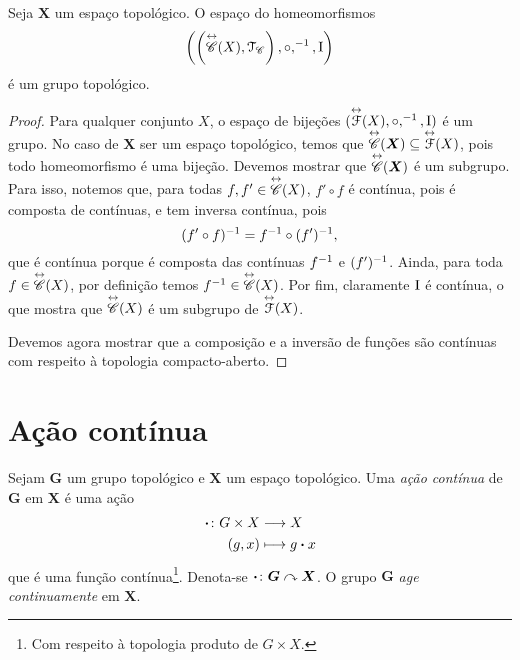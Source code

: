 
\begin{proposition}
Seja $\bm X$ um espaço topológico. O espaço do homeomorfismos
	\begin{equation*}
	\left( \left( \overset{\leftrightarrow}{\mathscr{C}}(X),\mathcal{T}_{\mathscr{C}} \right),\circ,^{-1},\mathrm{I} \right)
	\end{equation*}
é um grupo topológico.
\end{proposition}
\begin{proof}
Para qualquer conjunto $X$, o espaço de bijeções $( \overset{\leftrightarrow}{\mathcal F}(X),\circ,^{-1},\mathrm{I} )$ é um grupo. No caso de $\bm X$ ser um espaço topológico, temos que $\overset{\leftrightarrow}{\mathscr{C}}(\bm X) \subseteq \overset{\leftrightarrow}{\mathcal F}(X)$, pois todo homeomorfismo é uma bijeção. Devemos mostrar que $\overset{\leftrightarrow}{\mathscr{C}}(\bm X)$ é um subgrupo. Para isso, notemos que, para todas $f,f' \in \overset{\leftrightarrow}{\mathscr{C}}(X)$, $f' \circ f$ é contínua, pois é composta de contínuas, e tem inversa contínua, pois
	\begin{equation*}
	(f' \circ f)^{-1} = f^{-1} \circ (f')^{-1},
	\end{equation*}
que é contínua porque é composta das contínuas $f^{-1}$ e $(f')^{-1}$. Ainda, para toda $f \in \overset{\leftrightarrow}{\mathscr{C}}(X)$, por definição temos $f^{-1} \in \overset{\leftrightarrow}{\mathscr{C}}(X)$. Por fim, claramente $\mathrm{I}$ é contínua, o que mostra que $\overset{\leftrightarrow}{\mathscr{C}}(X)$ é um subgrupo de $\overset{\leftrightarrow}{\mathcal F}(X)$.

Devemos agora mostrar que a composição e a inversão de funções são contínuas com respeito à topologia compacto-aberto.
\end{proof}

\section{Ação contínua}

\begin{definition}
Sejam $\bm G$ um grupo topológico e $\bm X$ um espaço topológico. Uma \emph{ação contínua} de $\bm G$ em $\bm X$ é uma ação
	\begin{align*}
	{\bm{\cdot}}\colon {G \times X} &\longrightarrow {X} \\{(g,x)} &\longmapsto g \bm{\cdot} x
	\end{align*}
que é uma função contínua\footnote{Com respeito à topologia produto de $G \times X$.}. Denota-se $\bm{\cdot}\colon \bm G \curvearrowright \bm X$. O grupo $\bm G$ \emph{age continuamente} em $\bm X$.
\end{definition}

